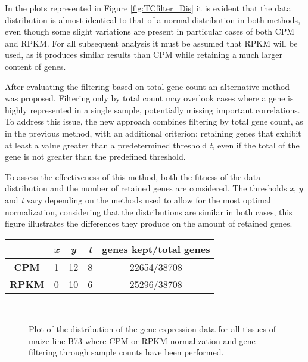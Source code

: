\documentclass[
]{article}
\begin{document}
In the plots represented in Figure \ref{fig:TCfilter_Dis} it is evident that the data
distribution is almost identical to that of a normal distribution in
both methods, even though some slight variations are present in
particular cases of both CPM and RPKM. For all subsequent analysis it
must be assumed that RPKM will be used, as it produces similar results
than CPM while retaining a much larger content of genes.

After evaluating the filtering based on total gene count an alternative
method was proposed. Filtering only by total count may overlook cases
where a gene is highly represented in a single sample, potentially
missing important correlations. To address this issue, the new approach
combines filtering by total gene count, as in the previous method, with
an additional criterion: retaining genes that exhibit at least a value
greater than a predetermined threshold \emph{t}, even if the total of
the gene is not greater than the predefined threshold.

To assess the effectiveness of this method, both the fitness of the data
distribution and the number of retained genes are considered. The
thresholds \emph{x}, \emph{y} and \emph{t} vary depending on the methods
used to allow for the most optimal normalization, considering that the
distributions are similar in both cases, this figure illustrates the
differences they produce on the amount of retained genes.

\begin{longtable}[]{@{}c c c c c@{}}
\toprule
& \emph{\textbf{x}} & \emph{\textbf{y}} & \emph{\textbf{t}} &
\textbf{genes kept/total genes}\tabularnewline
\midrule
\endhead
\textbf{CPM} & 1 & 12 & 8 & 22654/38708\tabularnewline
\textbf{RPKM} & 0 & 10 & 6 & 25296/38708\tabularnewline
\bottomrule
\end{longtable}

\begin{figure}[H]
  \centering
  
  	 \\
  	
  \caption[Filter SC B73 distribution]{\small Plot of the distribution of the gene expression data for all tissues of maize line B73 
  where CPM or RPKM normalization and gene filtering through sample counts have been performed.} %
  \label{fig:SCfilter_Dist}
\end{figure}
\end{document}
